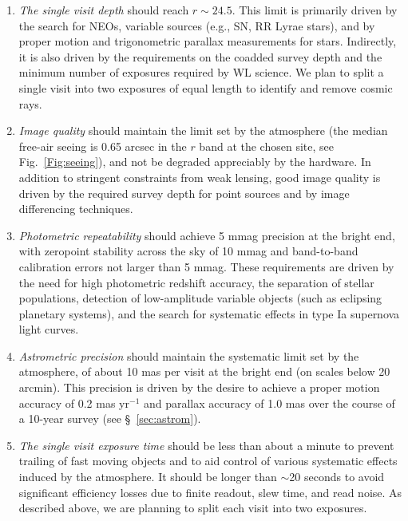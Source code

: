 \begin{enumerate}
\item  \textit{The single visit depth} should reach $r\sim24.5$. This limit is
   primarily driven by the search for NEOs, variable sources (e.g., SN,
   RR Lyrae stars), and by proper motion and trigonometric parallax
   measurements for stars. Indirectly, it is also driven by the
   requirements on the coadded survey depth and the minimum number of
   exposures required by WL science.  We plan to split a single visit
   into two exposures of equal length to identify and remove cosmic
   rays.
\item  \textit{Image quality} should maintain the limit set by the
     atmosphere (the median free-air seeing is 0.65 arcsec in the $r$ band
     at the chosen site, see Fig.~\ref{Fig:seeing}),
     and not be degraded appreciably by the hardware. In addition to stringent
     constraints from weak lensing, good image quality is driven by the
     required survey depth for point sources and by image differencing
     techniques.
\item  \textit{Photometric repeatability} should achieve 5 mmag precision
     at the bright end, with zeropoint stability across the sky of 10 mmag
     and band-to-band calibration errors not larger than 5 mmag.
     These requirements are driven by the need for high photometric redshift accuracy,
     the separation of stellar populations, detection of low-amplitude variable
     objects (such as eclipsing planetary systems), and the search for
     systematic effects in type Ia supernova light curves.
\item  \textit{Astrometric precision} should maintain the systematic limit set by
     the atmosphere, of about 10 mas per visit at the bright end
     (on scales below 20 arcmin). This precision is driven by the desire to
     achieve a proper motion accuracy of 0.2 mas yr$^{-1}$ and parallax accuracy of
     1.0 mas over the course of a 10-year survey (see \S~\ref{sec:astrom}).
\item  \textit{The single visit exposure time}
should be less than about a minute
    to prevent trailing of fast moving objects and to aid control
    of various systematic effects induced by the atmosphere. It should
    be longer than $\sim$20 seconds to avoid significant efficiency losses due to
    finite readout, slew time, and read noise.  As described above, we
    are planning to split each visit into two exposures.

\end{enumerate}
